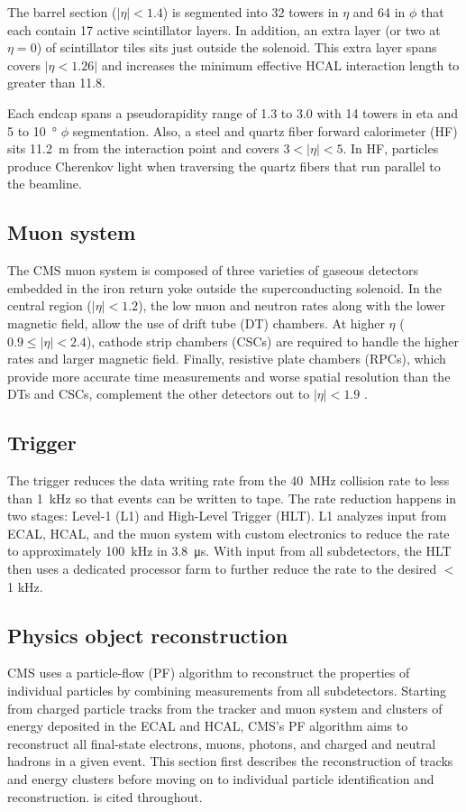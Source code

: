 The barrel section ($|\eta|<1.4$) is segmented into \num{32} towers in $\eta$ and \num{64} in $\phi$ that each contain 17 active scintillator layers. In addition, an extra layer (or two at $\eta = \num{0}$) of scintillator tiles sits just outside the solenoid. This extra layer spans covers $|\eta<1.26|$ and increases the minimum effective HCAL interaction length to greater than \num{11.8}.

Each endcap spans a pseudorapidity range of \num{1.3} to \num{3.0} with \num{14} towers in eta and \num{5} to \SI{10}{\degree} $\phi$ segmentation. Also, a steel and quartz fiber forward calorimeter (HF) sits \SI{11.2}{m} from the interaction point and covers $3<|\eta|<5$. In HF, particles produce Cherenkov light when traversing the quartz fibers that run parallel to the beamline.


\subsection{Muon system}
The CMS muon system is composed of three varieties of gaseous detectors embedded in the iron return yoke outside the superconducting solenoid. In the central region ($|\eta|<1.2$), the low muon and neutron rates along with the lower magnetic field, allow the use of drift tube (DT) chambers. At higher $\eta$ ($0.9\leq|\eta|<2.4$), cathode strip chambers (CSCs) are required to handle the higher rates and larger magnetic field. Finally, resistive plate chambers (RPCs), which provide more accurate time measurements and worse spatial resolution than the DTs and CSCs, complement the other detectors out to $|\eta|<1.9$ \cite{cms_tdr_v1, cms_ms_performance}. 

\subsection{Trigger}
\label{trigger}
The trigger reduces the data writing rate from the \SI{40}{\MHz} collision rate to less than \SI{1}{\kHz} so that events can be written to tape. The rate reduction happens in two stages: Level-1 (L1) and High-Level Trigger (HLT). L1 analyzes input from ECAL, HCAL, and the muon system with custom electronics to reduce the rate to approximately \SI{100}{\kHz} in \SI{3.8}{\us}. With input from all subdetectors, the HLT then uses a dedicated processor farm to further reduce the rate to the desired $<$ 1 kHz\cite{cms_experiment, cms_trigger_upgrade}.

\subsection{Physics object reconstruction}
CMS uses a particle-flow (PF) algorithm to reconstruct the properties of individual particles by combining measurements from all subdetectors. Starting from charged particle tracks from the tracker and muon system and clusters of energy deposited in the ECAL and HCAL, CMS's PF algorithm aims to reconstruct all final-state electrons, muons, photons, and charged and neutral hadrons in a given event. This section first describes the reconstruction of tracks and energy clusters before moving on to individual particle identification and reconstruction. \cite{cms_pf} is cited throughout.

